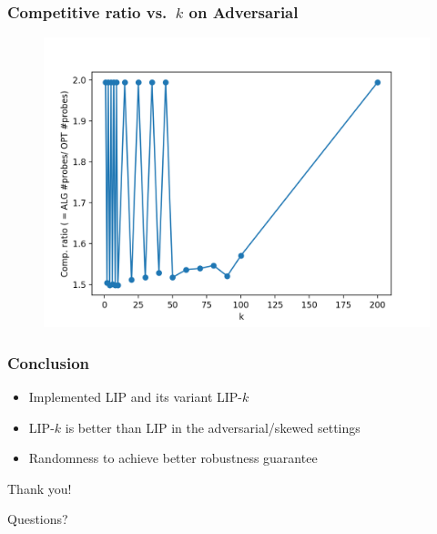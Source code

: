 \documentclass{beamer}
\begin{document}
\begin{frame}
  \frametitle{Competitive ratio vs.\ $k$ on Adversarial}
  \begin{figure}
    \centering
    \includegraphics[height=0.7\textheight,keepaspectratio]{cr-k-skewed}
  \end{figure}
\end{frame}



\begin{frame}
\frametitle{Conclusion}

  \begin{itemize}
    \item Implemented LIP and its variant LIP-$k$
    \item LIP-$k$ is better than LIP in the adversarial/skewed settings
    \item Randomness to achieve better robustness guarantee
  \end{itemize}
\end{frame}


\begin{frame}
\Huge{Thank you!}
\end{frame}

\begin{frame}
\Huge{Questions?}
\end{frame}
\end{document}
